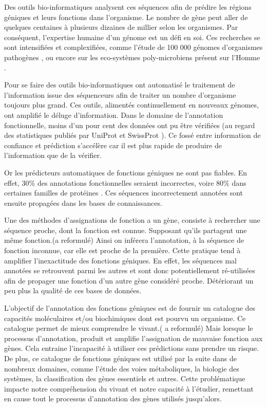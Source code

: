 Des outils bio-informatiques analysent ces séquences afin de prédire les régions géniques et leurs fonctions dans l'organisme. Le nombre de gène peut aller de quelques centaines à plusieurs dizaines de millier selon les organismes. Par conséquent, l'expertise humaine d'un génome est un défi en soi. Ces recherches se sont intensifiées et complexifiées, comme l'étude de 100 000 génomes d'organismes pathogènes \citep[voir][]{100kfoodborne}, ou encore sur les eco-systèmes poly-microbiens présent sur l'Homme \citep[voir][]{hmp}.

Pour se faire des outils bio-informatiques ont automatisé le traitement de l'information issue des séquenceurs afin de traiter un nombre d'organisme toujours plus grand. Ces outils, alimentés continuellement en nouveaux génomes, ont amplifié le déluge d'information. Dans le domaine de l'annotation fonctionnelle, moins d'un pour cent des données ont pu être vérifiées (au regard des statistiques publiés par UniProt et SwissProt \parencites{uniprot_stat}{expasy_stat} ). Ce fossé entre information de confiance et prédiction s'accélère car il est plus rapide de produire de l'information que de la vérifier.

Or les prédicteurs automatiques de fonctions géniques ne sont pas fiables. En effet, 30\% des annotations fonctionnelles seraient incorrectes, voire 80\% dans certaines familles de protéines \parencites{devos2001intrinsic}{schnoes2009annotation}. Ces séquences incorrectement annotées sont ensuite propagées dans les bases de connaissances.

Une des méthodes d'assignations de fonction a un gène, consiste à rechercher une séquence proche, dont la fonction est connue. Supposant qu'ils partagent une même fonction.(a reformulé) Ainsi on inférera l'annotation, à la séquence de fonction inconnue, car elle est proche de la première. Cette pratique tend à amplifier l'inexactitude des fonctions géniques. En effet, les séquences mal annotées se retrouvent parmi les autres et sont donc potentiellement ré-utilisées  afin de propager une fonction d'un autre gène considéré proche. Détériorant un peu plus la qualité de ces bases de données.

L'objectif de l'annotation des fonctions géniques est de fournir un catalogue des capacités moléculaires et/ou biochimiques dont est pourvu un organisme. Ce catalogue permet de mieux comprendre le vivant.( a reformulé) Mais lorsque le processus d'annotation, produit et amplifie l'assignation de mauvaise fonction aux gènes. Cela entraine l'incapacité à utiliser ces prédictions sans prendre un risque. De plus, ce catalogue de fonctions géniques est utilisé par la suite dans de nombreux domaines, comme l'étude des voies métaboliques, la biologie des systèmes, la classification des gènes essentiels et autres. Cette problématique impacte notre compréhension du vivant et notre capacité à l'étudier, remettant en cause tout le processus d'annotation des gènes utilisés jusqu'alors.

